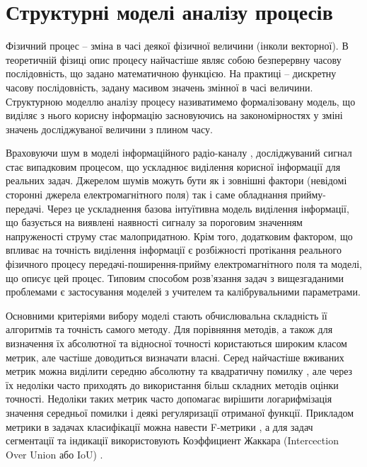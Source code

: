 \section{Структурні моделі аналізу процесів}

Фізичний процес -- зміна в часі деякої фізичної величини (інколи векторної). 
В теоретичній фізиці опис процесу найчастіше являє собою безперервну часову 
послідовність, що задано математичною функцією. На практиці -- дискретну часову 
послідовність, задану масивом значень змінної в часі величини. Структурною 
моделлю аналізу процесу називатимемо формалізовану модель, що виділяє з нього 
корисну інформацію засновуючись на закономірностях у зміні значень 
досліджуваної величини з плином часу.

Враховуючи шум в моделі інформаційного радіо-каналу \cite{imp:Shihovcev2011}, 
досліджуваний сигнал стає випадковим процесом, що ускладнює виділення 
корисної інформації для реальних задач. Джерелом шумів можуть бути як і 
зовнішні фактори (невідомі сторонні джерела електромагнітного поля) так і
саме обладнання прийму-передачі. Через це ускладнення базова інтуїтивна модель
виділення інформації, що базується на виявлені наявності сигналу за 
пороговим значенням напруженості струму стає малопридатною. Крім того,
додатковим фактором, що впливає на точність виділення інформації є розбіжності
протікання реального фізичного процесу передачі-поширення-прийму 
електромагнітного поля та моделі, що описує цей процес. Типовим способом 
розв'язання задач з вищезгаданими проблемами є застосування моделей з учителем
та калібрувальними параметрами.


Основними критеріями вибору моделі стають обчислювальна складність її алгоритмів 
та точність самого методу. Для порівняння методів, а також для визначення їх 
абсолютної та відносної точності користаються широким класом метрик, але 
частіше доводиться визначати власні. Серед найчастіше вживаних метрик можна 
виділити середню абсолютну та квадратичну помилку \cite{imp:Willmott2005}, 
але через їх недоліки часто приходять до використання більш складних методів 
оцінки точності. Недоліки таких метрик часто допомагає вирішити логарифмізація 
значення середньої помилки і деякі регуляризації отриманої функції. 
Прикладом метрики в задачах класифікації можна навести F-метрики 
\cite{imp:Tharwat2018}, а для задач сегментації та індикації використовують 
Коэффициент Жаккара (Intercection Over Union або IoU) \cite{imp:Jaccard1901}.

